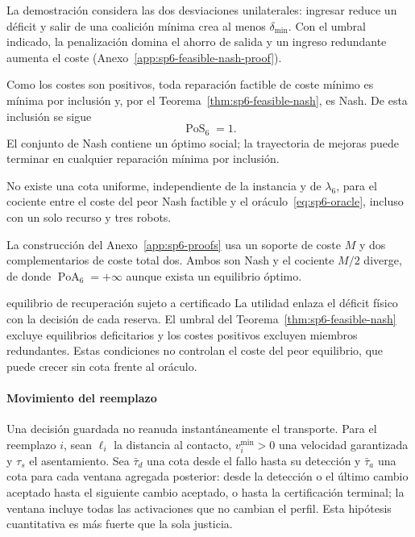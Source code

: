 La demostración considera las dos desviaciones unilaterales: ingresar reduce un déficit y salir de una coalición mínima crea al menos $\delta_{\min}$. Con el umbral indicado, la penalización domina el ahorro de salida y un ingreso redundante aumenta el coste (Anexo~\ref{app:sp6-feasible-nash-proof}).

Como los costes son positivos, toda reparación factible de coste mínimo es mínima por inclusión y, por el Teorema~\ref{thm:sp6-feasible-nash}, es Nash. De esta inclusión se sigue
\begin{equation}
 \operatorname{PoS}_6=1.
 \label{eq:sp6-pos}
\end{equation}
El conjunto de Nash contiene un óptimo social; la trayectoria de mejoras puede terminar en cualquier reparación mínima por inclusión.

\begin{proposicion}
\label{prop:sp6-unbounded-poa}
No existe una cota uniforme, independiente de la instancia y de $\lambda_6$, para el cociente entre el coste del peor Nash factible y el oráculo~\eqref{eq:sp6-oracle}, incluso con un solo recurso y tres robots.
\end{proposicion}

La construcción del Anexo~\ref{app:sp6-proofs} usa un soporte de coste $M$ y dos complementarios de coste total dos. Ambos son Nash y el cociente $M/2$ diverge, de donde $\operatorname{PoA}_6=+\infty$ aunque exista un equilibrio óptimo.

\begin{contribucion}{equilibrio de recuperación sujeto a certificado}
La utilidad enlaza el déficit físico con la decisión de cada reserva. El umbral del Teorema~\ref{thm:sp6-feasible-nash} excluye equilibrios deficitarios y los costes positivos excluyen miembros redundantes. Estas condiciones no controlan el coste del peor equilibrio, que puede crecer sin cota frente al oráculo.
\end{contribucion}

\paragraph{Movimiento del reemplazo}

Una decisión guardada no reanuda instantáneamente el transporte. Para el reemplazo $i$, sean $\ell_i$ la distancia al contacto, $v_i^{\min}>0$ una velocidad garantizada y $\tau_s$ el asentamiento. Sea $\bar\tau_d$ una cota desde el fallo hasta su detección y $\bar\tau_a$ una cota para cada ventana agregada posterior: desde la detección o el último cambio aceptado hasta el siguiente cambio aceptado, o hasta la certificación terminal; la ventana incluye todas las activaciones que no cambian el perfil. Esta hipótesis cuantitativa es más fuerte que la sola justicia.


